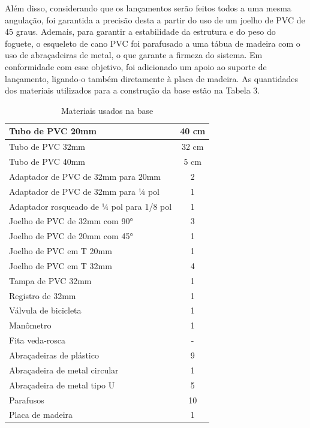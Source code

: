 	Além disso, considerando que os lançamentos serão feitos todos a uma mesma angulação, foi garantida a precisão desta a partir do uso de um joelho de PVC de 45 graus. Ademais, para garantir a estabilidade da estrutura e do peso do foguete, o esqueleto de cano PVC foi parafusado a uma tábua de madeira com o uso de abraçadeiras de metal, o que garante a firmeza do sistema. Em conformidade com esse objetivo, foi adicionado um apoio ao suporte de lançamento, ligando-o também diretamente à placa de madeira. As quantidades dos materiais utilizados para a construção da base estão na Tabela 3.

\begin{table}[htpb]
\begin{center}
\caption{Materiais usados na base}
\begin{tabular}{|l|c|}
\hline
Tubo de PVC 20mm                        & 40 cm \\ \hline
Tubo de PVC 32mm                        & 32 cm  \\ \hline
Tubo de PVC 40mm                        & 5 cm  \\ \hline
Adaptador de PVC de 32mm para 20mm      & 2     \\ \hline
Adaptador de PVC de 32mm para ¼ pol     & 1     \\ \hline
Adaptador rosqueado de ¼ pol para 1/8 pol & 1   \\ \hline
Joelho de PVC de 32mm com 90°           & 3     \\ \hline
Joelho de PVC de 20mm com 45°           & 1     \\ \hline
Joelho de PVC em T 20mm                 & 1     \\ \hline
Joelho de PVC em T 32mm                 & 4     \\ \hline
Tampa de PVC 32mm                       & 1     \\ \hline
Registro de 32mm                        & 1     \\ \hline
Válvula de bicicleta                    & 1     \\ \hline
Manômetro                               & 1     \\ \hline
Fita veda-rosca                         & -     \\ \hline
Abraçadeiras de plástico                & 9     \\ \hline
Abraçadeira de metal circular           & 1     \\ \hline
Abraçadeira de metal tipo U             & 5     \\ \hline
Parafusos                               & 10    \\ \hline
Placa de madeira                        & 1     \\ \hline

\end{tabular}
\end{center}
\label{Tabela 3 - Materiais da Base de Lançamento}
\end{table}

